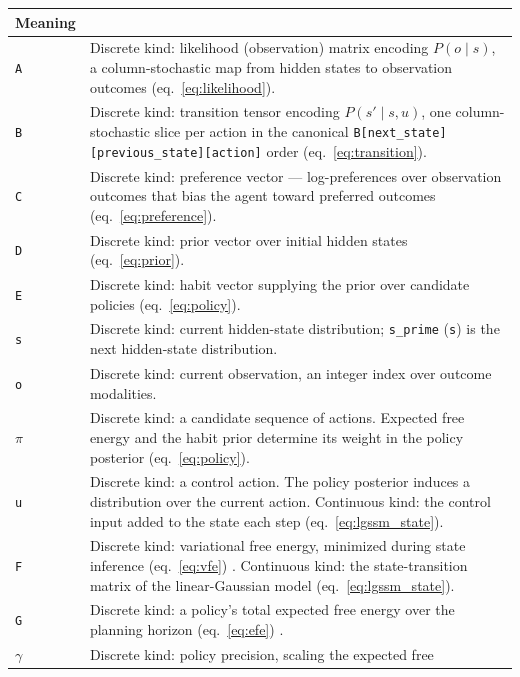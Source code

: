 \documentclass[
  english,
  9pt,
]{extarticle}
\begin{document}
\begin{longtable}[]{@{}
  >{\raggedright\arraybackslash}p{}
  >{\raggedright\arraybackslash}p{}@{}}
\begin{minipage}[b]{\linewidth}
M\allowbreak{}e\allowbreak{}a\allowbreak{}n\allowbreak{}i\allowbreak{}n\allowbreak{}g
\end{minipage} \\
\midrule\noalign{}
\endhead
\bottomrule\noalign{}
\endlastfoot
\texttt{A} & Discrete kind: likelihood (observation) matrix encoding
\(P(o \mid s)\), a column-stochastic map from hidden states to
observation outcomes (eq.~\ref{eq:likelihood}). \\
\texttt{B} & Discrete kind: transition tensor encoding
\(P(s' \mid s, u)\), one column-stochastic slice per action in the
canonical \texttt{B{[}next\_state{]}{[}previous\_state{]}{[}action{]}}
order (eq.~\ref{eq:transition}). \\
\texttt{C} & Discrete kind: preference vector --- log-preferences over
observation outcomes that bias the agent toward preferred outcomes
(eq.~\ref{eq:preference}). \\
\texttt{D} & Discrete kind: prior vector over initial hidden states
(eq.~\ref{eq:prior}). \\
\texttt{E} & Discrete kind: habit vector supplying the prior over
candidate policies (eq.~\ref{eq:policy}). \\
\texttt{s} & Discrete kind: current hidden-state distribution;
\texttt{s\_prime} (\texttt{s\textquotesingle{}}) is the next
hidden-state distribution. \\
\texttt{o} & Discrete kind: current observation, an integer index over
outcome modalities. \\
\texttt{\texorpdfstring{\ensuremath{\pi}}{pi}} & Discrete kind: a candidate sequence of actions. Expected
free energy and the habit prior determine its weight in the policy
posterior (eq.~\ref{eq:policy}). \\
\texttt{u} & Discrete kind: a control action. The policy posterior
induces a distribution over the current action. Continuous kind: the
control input added to the state each step
(eq.~\ref{eq:lgssm_state}). \\
\texttt{F} & Discrete kind: variational free energy, minimized during
state inference (eq.~\ref{eq:vfe}) \citep{friston2010}. Continuous kind:
the state-transition matrix of the linear-Gaussian model
(eq.~\ref{eq:lgssm_state}). \\
\texttt{G} & Discrete kind: a policy's total expected free energy over
the planning horizon (eq.~\ref{eq:efe}) \citep{dacosta2020}. \\
\texttt{\texorpdfstring{\ensuremath{\gamma}}{gamma}} & Discrete kind: policy precision, scaling the expected free

\end{longtable}
\end{document}
